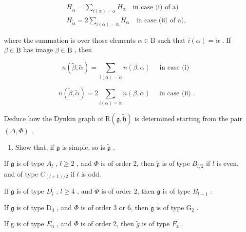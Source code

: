 \[
\begin{array}{l} H _ {\tilde {\alpha}} = \sum_ {i (\alpha) = \tilde {\alpha}} H _ {\alpha} \quad \text {in case (i) of a)} \\ H _ {\tilde {\alpha}} = 2 \sum_ {i (\alpha) = \tilde {\alpha}} H _ {\alpha} \quad \text {in case (ii) of a)}, \end{array}
\]

where the summation is over those elements \(\alpha \in \mathrm{B}\) such that \(i(\alpha) = \tilde{\alpha}\) . If \(\beta \in \mathrm{B}\) has image \(\tilde{\beta} \in \tilde{\mathrm{B}}\) , then

\[
  n (\tilde {\beta}, \tilde {\alpha}) = \sum_ {i (\alpha) = \tilde {\alpha}} n (\beta , \alpha) \quad \text { in   case   (i) }
\]

\[
n (\tilde {\beta}, \tilde {\alpha}) = 2 \sum_ {i (\alpha) = \tilde {\alpha}} n (\beta , \alpha) \quad \text { in   case   (ii) }.
\]

Deduce how the Dynkin graph of \(\mathrm{R}(\tilde{\mathfrak{g}},\tilde{\mathfrak{h}})\) is determined starting from the pair \((\varDelta,\varPhi)\) .

\begin{enumerate}
\def\labelenumi{\alph{enumi})}
\setcounter{enumi}{2}
\tightlist
\item
  Show that, if \(\mathfrak{g}\) is simple, so is \(\tilde{\mathfrak{g}}\) .
\end{enumerate}

If \(\mathfrak{g}\) is of type \(A_l\) , \(l \geq 2\) , and \(\varPhi\) is of order 2, then \(\tilde{\mathfrak{g}}\) is of type \(B_{l/2}\) if \(l\) is even, and of type \(C_{(l+1)/2}\) if \(l\) is odd.

If \(\mathfrak{g}\) is of type \(D_l\) , \(l \geq 4\) , and \(\varPhi\) is of order 2, then \(\tilde{\mathfrak{g}}\) is of type \(B_{l-1}\) .

If \(\mathfrak{g}\) is of type \(\mathrm{D}_4\) , and \(\varPhi\) is of order 3 or 6, then \(\tilde{\mathfrak{g}}\) is of type \(\mathrm{G}_2\) .

If g is of type \(E_{6}\) , and \(\Phi\) is of order 2, then \(\tilde{g}\) is of type \(F_{4}\) .

